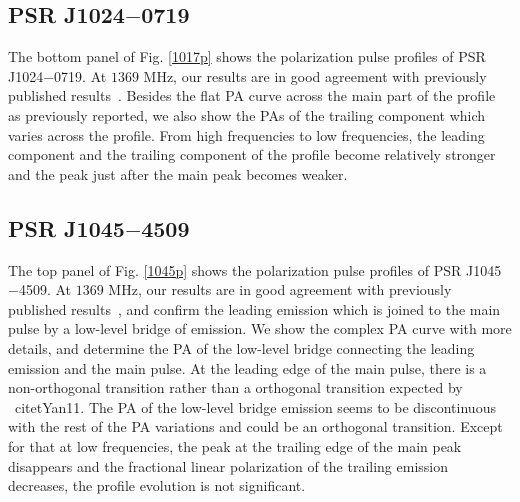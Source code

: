 \documentclass[useAMS,usenatbib]{mn2e}
\begin{document}
%


%
\subsection{PSR J1024$-$0719}

The bottom panel of Fig. \ref{1017p} shows the polarization pulse profiles of 
PSR J1024$-$0719.
%
At $1369$ MHz, our results are in good agreement with previously published
results~\citep{Ord04,Yan11}. 
%
Besides the flat PA curve across the main part of the profile as 
previously reported, we also show the PAs of the trailing component which 
varies across the profile.
%
From high frequencies to low frequencies, the leading component and the 
trailing component of the profile become relatively stronger and the peak 
just after the main peak becomes weaker.



%
\subsection{PSR J1045$-$4509}

The top panel of Fig. \ref{1045p} shows the polarization pulse profiles of 
PSR J1045$-$4509.
%
At $1369$ MHz, our results are in good agreement with previously published
results~\citep{Yan11}, and confirm the leading emission which is joined to 
the main pulse by a low-level bridge of emission.
%
We show the complex PA curve with more details, and determine the PA of the 
low-level bridge connecting the leading emission and the main pulse.
%
At the leading edge of the main pulse, there is a non-orthogonal transition 
rather than a orthogonal transition expected by ~citet{Yan11}.
%
The PA of the low-level bridge emission seems to be discontinuous with 
the rest of the PA variations and could be an orthogonal transition.
%
Except for that at low frequencies, the peak at the trailing edge of the 
main peak disappears and the fractional linear polarization of the trailing 
emission decreases, the profile evolution is not significant.
\end{document}
